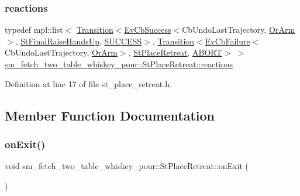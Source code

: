 \subsubsection{\texorpdfstring{reactions}{reactions}}
{\footnotesize\ttfamily typedef mpl\+::list$<$ \hyperlink{classsmacc_1_1Transition}{Transition}$<$\hyperlink{structsmacc_1_1EvCbSuccess}{Ev\+Cb\+Success}$<$Cb\+Undo\+Last\+Trajectory, \hyperlink{classsm__fetch__two__table__whiskey__pour_1_1OrArm}{Or\+Arm}$>$, \hyperlink{structsm__fetch__two__table__whiskey__pour_1_1StFinalRaiseHandsUp}{St\+Final\+Raise\+Hands\+Up}, \hyperlink{structsmacc_1_1default__transition__tags_1_1SUCCESS}{S\+U\+C\+C\+E\+SS}$>$, \hyperlink{classsmacc_1_1Transition}{Transition}$<$\hyperlink{structsmacc_1_1EvCbFailure}{Ev\+Cb\+Failure}$<$Cb\+Undo\+Last\+Trajectory, \hyperlink{classsm__fetch__two__table__whiskey__pour_1_1OrArm}{Or\+Arm}$>$, \hyperlink{structsm__fetch__two__table__whiskey__pour_1_1StPlaceRetreat}{St\+Place\+Retreat}, \hyperlink{structsmacc_1_1default__transition__tags_1_1ABORT}{A\+B\+O\+RT}$>$ $>$ \hyperlink{structsm__fetch__two__table__whiskey__pour_1_1StPlaceRetreat_ac25d5417461c2afbf484e23c05eaa058}{sm\+\_\+fetch\+\_\+two\+\_\+table\+\_\+whiskey\+\_\+pour\+::\+St\+Place\+Retreat\+::reactions}}



Definition at line 17 of file st\+\_\+place\+\_\+retreat.\+h.



\subsection{Member Function Documentation}
\mbox{\label{structsm__fetch__two__table__whiskey__pour_1_1StPlaceRetreat_a89197ffd2fe8d2fe2ca09502b0c13bbc}} 
\subsubsection{\texorpdfstring{on\+Exit()}{onExit()}\hspace{0.1cm}{\footnotesize\ttfamily [1/2]}}
{\footnotesize\ttfamily void sm\+\_\+fetch\+\_\+two\+\_\+table\+\_\+whiskey\+\_\+pour\+::\+St\+Place\+Retreat\+::on\+Exit (\begin{DoxyParamCaption}\item[{\hyperlink{structsmacc_1_1default__transition__tags_1_1SUCCESS}{S\+U\+C\+C\+E\+SS}}]{ }\end{DoxyParamCaption})\hspace{0.3cm}{\ttfamily [inline]}}



